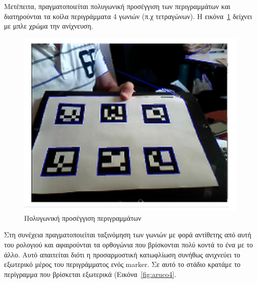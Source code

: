 Μετέπειτα, πραγματοποιείται πολυγωνική προσέγγιση των περιγραμμάτων και διατηρούνται τα κοίλα περιγράμματα 4 γωνιών (π.χ τετραγώνων). Η εικόνα~\ref{fig:aruco3} δείχνει με μπλε χρώμα την ανίχνευση.


\begin{figure}[H]
    \centering
    \includegraphics[scale=0.55, angle=0]{Files/Figures/aruco3.png}
    \caption[Πολυγωνική προσέγγιση περιγραμμάτων]{Πολυγωνική προσέγγιση περιγραμμάτων}
    \label{fig:aruco3}
\end{figure}



Στη συνέχεια πραγματοποιείται ταξινόμηση των γωνιών με φορά αντίθετης από αυτή του ρολογιού και αφαιρούνται τα ορθογώνια που βρίσκονται πολύ κοντά το ένα με το άλλο. Αυτό απαιτείται διότι η προσαρμοστική κατωφλίωση συνήθως ανιχνεύει το εξωτερικό μέρος του περιγράμματος ενός marker. Σε αυτό το στάδιο κρατάμε το περίγραμμα που βρίσκεται εξωτερικά (Εικόνα~\ref{fig:aruco4}.



